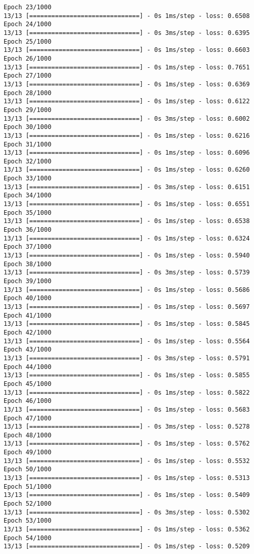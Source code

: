 \documentclass[11pt]{article}
\begin{document}
\begin{Verbatim}[commandchars=\\\{\}]
Epoch 23/1000
13/13 [==============================] - 0s 1ms/step - loss: 0.6508
Epoch 24/1000
13/13 [==============================] - 0s 3ms/step - loss: 0.6395
Epoch 25/1000
13/13 [==============================] - 0s 1ms/step - loss: 0.6603
Epoch 26/1000
13/13 [==============================] - 0s 1ms/step - loss: 0.7651
Epoch 27/1000
13/13 [==============================] - 0s 1ms/step - loss: 0.6369
Epoch 28/1000
13/13 [==============================] - 0s 1ms/step - loss: 0.6122
Epoch 29/1000
13/13 [==============================] - 0s 3ms/step - loss: 0.6002
Epoch 30/1000
13/13 [==============================] - 0s 1ms/step - loss: 0.6216
Epoch 31/1000
13/13 [==============================] - 0s 1ms/step - loss: 0.6096
Epoch 32/1000
13/13 [==============================] - 0s 1ms/step - loss: 0.6260
Epoch 33/1000
13/13 [==============================] - 0s 3ms/step - loss: 0.6151
Epoch 34/1000
13/13 [==============================] - 0s 1ms/step - loss: 0.6551
Epoch 35/1000
13/13 [==============================] - 0s 1ms/step - loss: 0.6538
Epoch 36/1000
13/13 [==============================] - 0s 1ms/step - loss: 0.6324
Epoch 37/1000
13/13 [==============================] - 0s 1ms/step - loss: 0.5940
Epoch 38/1000
13/13 [==============================] - 0s 3ms/step - loss: 0.5739
Epoch 39/1000
13/13 [==============================] - 0s 1ms/step - loss: 0.5686
Epoch 40/1000
13/13 [==============================] - 0s 1ms/step - loss: 0.5697
Epoch 41/1000
13/13 [==============================] - 0s 1ms/step - loss: 0.5845
Epoch 42/1000
13/13 [==============================] - 0s 1ms/step - loss: 0.5564
Epoch 43/1000
13/13 [==============================] - 0s 3ms/step - loss: 0.5791
Epoch 44/1000
13/13 [==============================] - 0s 1ms/step - loss: 0.5855
Epoch 45/1000
13/13 [==============================] - 0s 1ms/step - loss: 0.5822
Epoch 46/1000
13/13 [==============================] - 0s 1ms/step - loss: 0.5683
Epoch 47/1000
13/13 [==============================] - 0s 3ms/step - loss: 0.5278
Epoch 48/1000
13/13 [==============================] - 0s 1ms/step - loss: 0.5762
Epoch 49/1000
13/13 [==============================] - 0s 1ms/step - loss: 0.5532
Epoch 50/1000
13/13 [==============================] - 0s 1ms/step - loss: 0.5313
Epoch 51/1000
13/13 [==============================] - 0s 1ms/step - loss: 0.5409
Epoch 52/1000
13/13 [==============================] - 0s 3ms/step - loss: 0.5302
Epoch 53/1000
13/13 [==============================] - 0s 1ms/step - loss: 0.5362
Epoch 54/1000
13/13 [==============================] - 0s 1ms/step - loss: 0.5209

\end{Verbatim}
\end{document}
